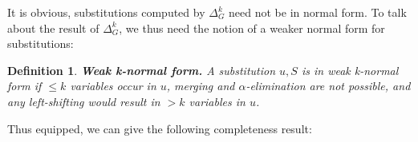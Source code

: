\documentclass[a4paper, 11pt]{report}
\newtheorem{theorem}{Theorem}
\newtheorem{definition}{Definition}
\begin{document}
It is obvious, substitutions computed by $\Delta_G^k$ need not be in normal form. To talk about the result of $\Delta_G^k$, we thus need the notion of a weaker normal form for substitutions:

\begin{definition}
\textbf{Weak k-normal form.}
A substitution $u,S$ is in weak k-normal form if $\leq k$ variables occur in $u$, merging and $\alpha$-elimination are not possible, and any left-shifting would result in $> k$ variables in $u$.
\end{definition}

\noindent
Thus equipped, we can give the following completeness result:






\end{document}
